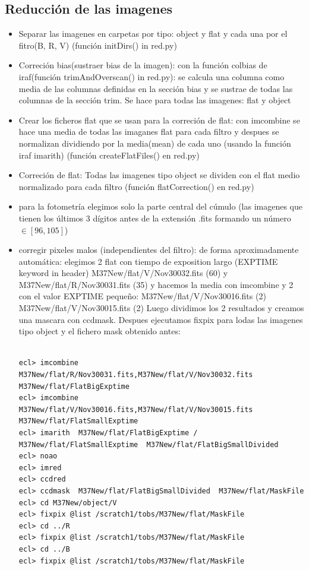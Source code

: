 \documentclass{article}
\begin{document}
\subsection*{Reducción de las imagenes}
\begin{itemize}
\item
Separar las imagenes en carpetas por tipo: object y flat y cada una por el fitro(B, R, V) (función initDirs() in red.py)
\item
Correción bias(sustraer bias de la imagen): con la función colbias de iraf(función trimAndOverscan() in red.py): se calcula una columna como media de las columnas definidas en la sección bias y se sustrae de todas las columnas de la sección trim. Se hace para todas las imagenes: flat y object
\item 
Crear los ficheros flat que se usan para la correción de flat:
con imcombine se hace una media de todas las imaganes flat para cada filtro y despues se normalizan dividiendo por la media(mean) de cada uno (usando la función iraf imarith) (función createFlatFiles() en red.py)
\item
Correción de flat:
Todas las imagenes tipo object se dividen con el flat medio normalizado para cada filtro (función flatCorrection() en red.py)
\item para la fotometría elegimos solo la parte central del cúmulo (las imagenes que tienen los últimos 3 dígitos antes de la extensión .fits  formando un número $ \in  [96,105] $)

\item corregir pixeles malos (independientes del filtro):
de forma aproximadamente automática: elegimos 2 flat con tiempo de exposition largo (EXPTIME keyword in header)
M37New/flat/V/Nov30032.fits (60) y M37New/flat/R/Nov30031.fits (35) y hacemos la media con imcombine
y 2 con el valor  EXPTIME pequeño: M37New/flat/V/Nov30016.fits (2)  M37New/flat/V/Nov30015.fits (2)
Luego dividimos los 2 resultados y creamos una mascara con ccdmask. Despues ejecutamos fixpix para lodas las imagenes tipo object y el fichero mask obtenido antes:

\begin{verbatim}

ecl> imcombine M37New/flat/R/Nov30031.fits,M37New/flat/V/Nov30032.fits M37New/flat/FlatBigExptime
ecl> imcombine M37New/flat/V/Nov30016.fits,M37New/flat/V/Nov30015.fits M37New/flat/FlatSmallExptime
ecl> imarith  M37New/flat/FlatBigExptime /  M37New/flat/FlatSmallExptime  M37New/flat/FlatBigSmallDivided
ecl> noao
ecl> imred
ecl> ccdred
ecl> ccdmask  M37New/flat/FlatBigSmallDivided  M37New/flat/MaskFile 
ecl> cd M37New/object/V
ecl> fixpix @list /scratch1/tobs/M37New/flat/MaskFile
ecl> cd ../R
ecl> fixpix @list /scratch1/tobs/M37New/flat/MaskFile
ecl> cd ../B
ecl> fixpix @list /scratch1/tobs/M37New/flat/MaskFile



\end{verbatim}
\end{itemize}
\end{document}
